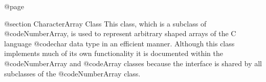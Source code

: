 @page

@section  CharacterArray Class
This class, which is a subclass of @code{NumberArray}, is used to
represent arbitrary shaped arrays of the C language @code{char} data
type in an efficient manner.  Although this class implements much of its
own functionality it is documented within the @code{NumberArray} and
@code{Array} classes because the interface is shared by all subclasses
of the @code{NumberArray} class.






